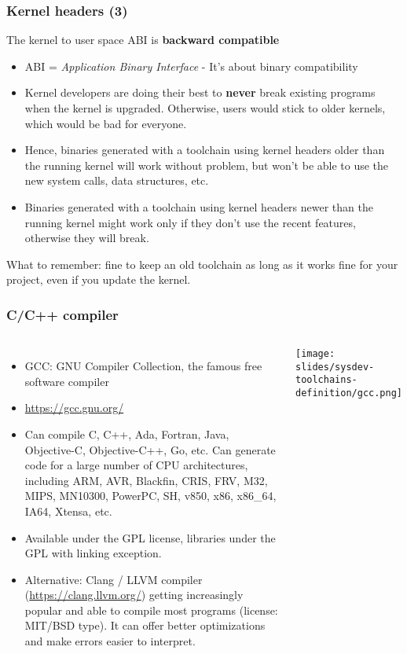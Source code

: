 \begin{frame}[fragile]
  \frametitle{Kernel headers (3)}
  The kernel to user space ABI is {\bf backward compatible}
  \begin{itemize}
  \item ABI = {\em Application Binary Interface} - It's about binary compatibility
  \item Kernel developers are doing their best to {\bf never}
        break existing programs when the kernel is upgraded.
        Otherwise, users would stick to older kernels, which
        would be bad for everyone.
  \item Hence, binaries generated with a toolchain using kernel headers
        older than the running kernel will work without problem, but
        won't be able to use the new system calls, data structures, etc.
  \item Binaries generated with a toolchain using kernel headers
        newer than the running kernel might work only if they don't use
        the recent features, otherwise they will break.
  \end{itemize}
  What to remember: fine to keep an old toolchain as long as it
  works fine for your project, even if you update the kernel.
\end{frame}

\begin{frame}
  \frametitle{C/C++ compiler}
  \begin{columns}
    \begin{itemize}
    \item GCC: GNU Compiler Collection, the famous free software compiler
    \item \url{https://gcc.gnu.org/}
    \item Can compile C, C++, Ada, Fortran, Java, Objective-C,
      Objective-C++, Go, etc. Can generate code for a large number of CPU
      architectures, including ARM, AVR, Blackfin, CRIS, FRV, M32, MIPS,
      MN10300, PowerPC, SH, v850, x86, x86\_64, IA64, Xtensa, etc.
    \item Available under the GPL license, libraries under the GPL with
      linking exception.
    \item Alternative: Clang / LLVM compiler (\url{https://clang.llvm.org/})
      getting increasingly popular and able to compile most programs
      (license: MIT/BSD type). It can offer better optimizations and
      make errors easier to interpret.
    \end{itemize}
    \texttt{[image: slides/sysdev-toolchains-definition/gcc.png]}
  \end{columns}
\end{frame}

